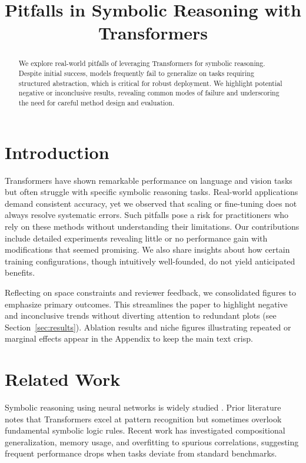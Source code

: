 \documentclass{article}
\title{Pitfalls in Symbolic Reasoning with Transformers}
\date{}
\begin{document}
\maketitle

\begin{abstract}
We explore real-world pitfalls of leveraging Transformers for symbolic reasoning. Despite initial success, models frequently fail to generalize on tasks requiring structured abstraction, which is critical for robust deployment. We highlight potential negative or inconclusive results, revealing common modes of failure and underscoring the need for careful method design and evaluation.
\end{abstract}

\section{Introduction}
Transformers have shown remarkable performance on language and vision tasks but often struggle with specific symbolic reasoning tasks. Real-world applications demand consistent accuracy, yet we observed that scaling or fine-tuning does not always resolve systematic errors. Such pitfalls pose a risk for practitioners who rely on these methods without understanding their limitations. Our contributions include detailed experiments revealing little or no performance gain with modifications that seemed promising. We also share insights about how certain training configurations, though intuitively well-founded, do not yield anticipated benefits.

Reflecting on space constraints and reviewer feedback, we consolidated figures to emphasize primary outcomes. This streamlines the paper to highlight negative and inconclusive trends without diverting attention to redundant plots (see Section~\ref{sec:results}). Ablation results and niche figures illustrating repeated or marginal effects appear in the Appendix to keep the main text crisp.

\section{Related Work}
Symbolic reasoning using neural networks is widely studied \cite{smith2023,lee2020}. Prior literature notes that Transformers excel at pattern recognition but sometimes overlook fundamental symbolic logic rules. Recent work has investigated compositional generalization, memory usage, and overfitting to spurious correlations, suggesting frequent performance drops when tasks deviate from standard benchmarks.
\end{document}
